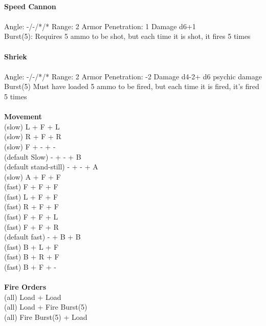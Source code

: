 \ \\
{\bf Speed Cannon } \\
\ \\
Angle: -/-/*/* Range: 2 Armor Penetration: 1 Damage d6+1 \\
\indent Burst(5): Requires 5 ammo to be shot, but each time it is shot, it fires 5 times \\



\ \\
{\bf Shriek } \\
\ \\
Angle: -/-/*/* Range: 2 Armor Penetration: -2 Damage d4-2+ d6 psychic damage \\
\indent Burst(5) Must have loaded 5 ammo to be fired, but each time it is fired, it's fired 5 times \\





\ \\ {\bf Movement } \\
(slow) L + F + L \\
(slow) R + F + R \\
(slow) F + - + - \\
(default Slow) - + - + B \\
(default stand-still) - + - + A \\
(slow) A + F + F \\
(fast) F + F + F \\
(fast) L + F + F \\
(fast) R + F + F \\
(fast) F + F + L \\
(fast) F + F + R \\
(default fast) - + B + B \\
(fast) B + L + F \\
(fast) B + R + F \\
(fast) B + F + - \\
\ \\ {\bf Fire Orders } \\
(all) Load + Load \\
(all) Load + Fire Burst(5) \\
(all) Fire Burst(5) + Load \\



